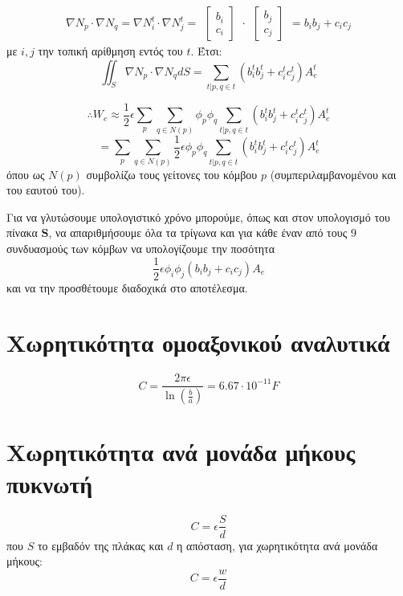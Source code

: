 \documentclass[10pt, letterpaper]{article}
\begin{document}
\[ \nabla N_p  \cdot \nabla N_q  = \nabla N_i^t \cdot \nabla N_j^t = 
    \begin{align} 
        \begin{bmatrix}
        b_i \\
        c_i
        \end{bmatrix}
    \end{align}  \cdot \begin{align} 
        \begin{bmatrix}
        b_j \\
        c_j        \end{bmatrix}
    \end{align}  =  b_ib_j + c_ic_j
\]
με $i,j$ την τοπική αρίθμηση εντός του $t$. Έτσι:
\[ \iint_S \nabla N_p  \cdot \nabla N_q  dS = \sum_{t | p,q \in t} (b_i^tb_j^t + c_i^tc_j^t) A_e^t  \]

\[ \therefore W_e \approx \frac{1}{2} \epsilon  \sum_p \sum_{q \in N(p)}  \phi_p \phi_q   \sum_{t | p,q \in t} (b_i^tb_j^t + c_i^tc_j^t) A_e^t  \]
\[ =   \sum_p \sum_{q \in N(p)} \frac{1}{2} \epsilon  \phi_p \phi_q   \sum_{t | p,q \in t} (b_i^tb_j^t + c_i^tc_j^t) A_e^t   \]
όπου ως $N(p)$ συμβολίζω τους γείτονες του κόμβου $p$ (συμπεριλαμβανομένου και του εαυτού του).

Για να γλυτώσουμε υπολογιστικό χρόνο μπορούμε, όπως και στον υπολογισμό του πίνακα $\mathbf{S}$, να απαριθμήσουμε όλα τα 
τρίγωνα και για κάθε έναν από τους $9$ συνδυασμούς των κόμβων να υπολογίζουμε την ποσότητα 
\[ \frac{1}{2} \epsilon  \phi_i \phi_j  (b_ib_j + c_ic_j) A_e   \]
και να την προσθέτουμε διαδοχικά στο αποτέλεσμα. 


\section*{Χωρητικότητα ομοαξονικού αναλυτικά }
\[ C = \frac{2 \pi \epsilon}{\ln (\frac{b}{a})} =  6.67 \cdot 10^{-11} F\]

\section*{Χωρητικότητα ανά μονάδα μήκους πυκνωτή}
\[ C = \epsilon \frac{S}{d} \]
 που $S$ το εμβαδόν της πλάκας και $d$ η απόσταση, για χωρητικότητα ανά μονάδα μήκους:
\[ C = \epsilon \frac{w}{d} \]
\end{document}
